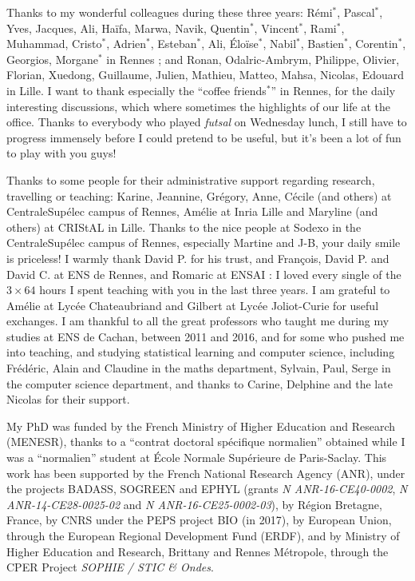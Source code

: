 \begin{acknowledgements}
Thanks to my wonderful colleagues during these three years: Rémi$^*$, Pascal$^*$, Yves, Jacques, Ali, Haïfa, Marwa, Navik, Quentin$^*$, Vincent$^*$, Rami$^*$, Muhammad, Cristo$^*$, Adrien$^*$, Esteban$^*$, Ali, Éloïse$^*$, Nabil$^*$, Bastien$^*$, Corentin$^*$, Georgios, Morgane$^*$ in Rennes ; and Ronan, Odalric-Ambrym, Philippe, Olivier, Florian, Xuedong, Guillaume, Julien, Mathieu, Matteo, Mahsa, Nicolas, Edouard in Lille.
I want to thank especially the ``coffee friends$^*$'' in Rennes, for the daily interesting discussions, which where sometimes the highlights of our life at the office.
%
Thanks to everybody who played \emph{futsal} on Wednesday lunch, I still have to progress immensely before I could pretend to be useful, but it's been a lot of fun to play with you guys!

Thanks to some people for their administrative support regarding research, travelling or teaching: Karine, Jeannine, Grégory, Anne, Cécile (and others) at CentraleSupélec campus of Rennes, Amélie at Inria Lille and Maryline (and others) at CRIStAL in Lille.
Thanks to the nice people at Sodexo in the CentraleSupélec campus of Rennes, especially Martine and J-B, your daily smile is priceless!
I warmly thank David P. for his trust, and François, David P. and David C. at ENS de Rennes, and Romaric at ENSAI : I loved every single of the $3 \times 64$ hours I spent teaching with you in the last three years.
I am grateful to Amélie at Lycée Chateaubriand and Gilbert at Lycée Joliot-Curie for useful exchanges.
%
I am thankful to all the great professors who taught me during my studies at ENS de Cachan, between 2011 and 2016, and for some who pushed me into teaching, and studying statistical learning and computer science, including Frédéric, Alain and Claudine in the maths department, Sylvain, Paul, Serge in the computer science department, and thanks to Carine, Delphine and the late Nicolas for their support.


My PhD was funded by the French Ministry of Higher Education and Research (MENESR),
thanks to a ``contrat doctoral spécifique normalien'' obtained while I was a ``normalien'' student at \'Ecole Normale Sup\'erieure de Paris-Saclay.
This work has been supported by
the French National Research Agency (ANR), under the projects BADASS, SOGREEN and EPHYL (grants \emph{N ANR-16-CE40-0002}, \emph{N ANR-14-CE28-0025-02} and \emph{N ANR-16-CE25-0002-03}),
by R\'egion Bretagne, France,
by CNRS under the PEPS project BIO (in 2017),
by European Union, through the European Regional Development Fund (ERDF),
and by Ministry of Higher Education and Research, Brittany and Rennes Métropole, through the CPER Project \emph{SOPHIE / STIC \& Ondes}.



\end{acknowledgements}
